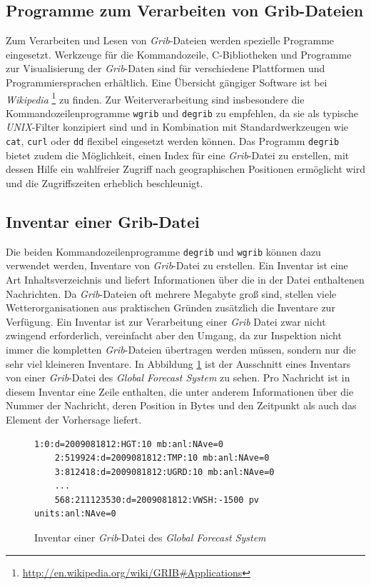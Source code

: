\subsection{Programme zum Verarbeiten von Grib-Dateien}
\label{grib-reader}
Zum Verarbeiten und Lesen von \textit{Grib}-Dateien werden spezielle
Programme eingesetzt. Werkzeuge für die Kommandozeile, C-Bibliotheken
und Programme zur Visualisierung der \textit{Grib}-Daten sind für
verschiedene Plattformen und Programmiersprachen erhältlich. Eine
Übersicht gängiger Software ist bei \textit{Wikipedia}
\footnote{\url{http://en.wikipedia.org/wiki/GRIB\#Applications}} zu
finden. Zur Weiterverarbeitung sind insbesondere die
Kommandozeilenprogramme \texttt{wgrib} und \texttt{degrib} zu
empfehlen, da sie als typische \textit{UNIX}-Filter konzipiert sind
und in Kombination mit Standardwerkzeugen wie \texttt{cat},
\texttt{curl} oder \texttt{dd} flexibel eingesetzt werden können. Das
Programm \texttt{degrib} bietet zudem die Möglichkeit, einen Index für
eine \textit{Grib}-Datei zu erstellen, mit dessen Hilfe ein wahlfreier
Zugriff nach geographischen Positionen ermöglicht wird und die
Zugriffszeiten erheblich beschleunigt.

\subsection{Inventar einer Grib-Datei}
Die beiden Kommandozeilenprogramme \texttt{degrib} und \texttt{wgrib}
können dazu verwendet werden, Inventare von \textit{Grib}-Datei zu
erstellen. Ein Inventar ist eine Art Inhaltsverzeichnis und liefert
Informationen über die in der Datei enthaltenen Nachrichten. Da
\textit{Grib}-Dateien oft mehrere Megabyte groß sind, stellen viele
Wetterorganisationen aus praktischen Gründen zusätzlich die Inventare
zur Verfügung. Ein Inventar ist zur Verarbeitung einer \textit{Grib}
Datei zwar nicht zwingend erforderlich, vereinfacht aber den Umgang,
da zur Inspektion nicht immer die kompletten \textit{Grib}-Dateien
übertragen werden müssen, sondern nur die sehr viel kleineren
Inventare. In Abbildung \ref{abbildung:inventar} ist der Ausschnitt
eines Inventars von einer \textit{Grib}-Datei des \textit{Global
  Forecast System} zu sehen. Pro Nachricht ist in diesem Inventar eine
Zeile enthalten, die unter anderem Informationen über die Nummer der
Nachricht, deren Position in Bytes und den Zeitpunkt als auch das
Element der Vorhersage liefert.

\begin{figure}[h]
  \begin{Verbatim}[frame=lines,framerule=0.5pt,framesep=3mm]
    1:0:d=2009081812:HGT:10 mb:anl:NAve=0
    2:519924:d=2009081812:TMP:10 mb:anl:NAve=0
    3:812418:d=2009081812:UGRD:10 mb:anl:NAve=0
    ...
    568:211123530:d=2009081812:VWSH:-1500 pv units:anl:NAve=0
  \end{Verbatim}
  \caption{Inventar einer \textit{Grib}-Datei des \textit{Global
      Forecast System} }
  \label{abbildung:inventar}
\end{figure}

